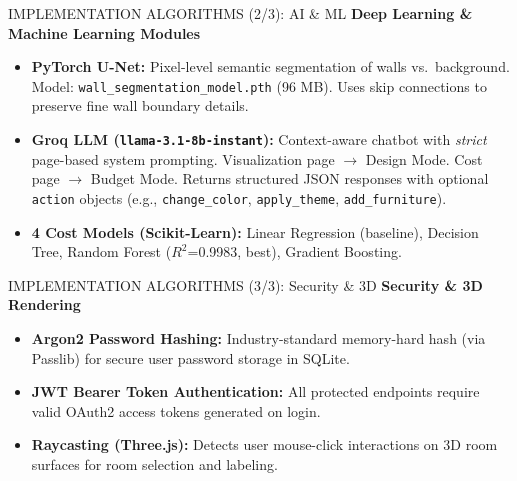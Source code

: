 \documentclass[aspectratio=169]{beamer}
\begin{document}
\begin{frame}{IMPLEMENTATION ALGORITHMS (2/3): AI \& ML}
\textbf{Deep Learning \& Machine Learning Modules}
\begin{itemize}
    \item \textbf{PyTorch U-Net:} Pixel-level semantic segmentation of walls vs.\ background. Model: \texttt{wall\_segmentation\_model.pth} (96 MB). Uses skip connections to preserve fine wall boundary details.
    \item \textbf{Groq LLM (\texttt{llama-3.1-8b-instant}):} Context-aware chatbot with \emph{strict} page-based system prompting. Visualization page $\rightarrow$ Design Mode. Cost page $\rightarrow$ Budget Mode. Returns structured JSON responses with optional \texttt{action} objects (e.g., \texttt{change\_color}, \texttt{apply\_theme}, \texttt{add\_furniture}).
    \item \textbf{4 Cost Models (Scikit-Learn):} Linear Regression (baseline), Decision Tree, Random Forest ($R^2$=0.9983, best), Gradient Boosting.
\end{itemize}
\end{frame}

\begin{frame}{IMPLEMENTATION ALGORITHMS (3/3): Security \& 3D}
\textbf{Security \& 3D Rendering}
\begin{itemize}
    \item \textbf{Argon2 Password Hashing:} Industry-standard memory-hard hash (via Passlib) for secure user password storage in SQLite.
    \item \textbf{JWT Bearer Token Authentication:} All protected endpoints require valid OAuth2 access tokens generated on login.
    \item \textbf{Raycasting (Three.js):} Detects user mouse-click interactions on 3D room surfaces for room selection and labeling.
\end{itemize}
\end{frame}
\end{document}
